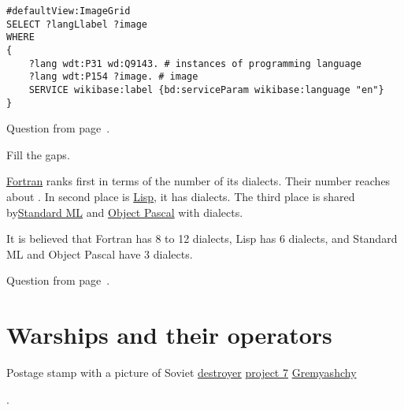\begin{lstlisting}[language=SPARQL, 
    caption={Programmers languages logos. SPARQL query: \href{https://w.wiki/kfd}{https://w.wiki/kfd}}, 
    label=lst:prog_lang_answer_1
                ]
#defaultView:ImageGrid
SELECT ?langLlabel ?image
WHERE
{
	?lang wdt:P31 wd:Q9143. # instances of programming language
	?lang wdt:P154 ?image. # image
	SERVICE wikibase:label {bd:serviceParam wikibase:language "en"}
}
\end{lstlisting}

Question from page~\pageref{question:prog_lang_2}.


\begin{exercise}
    \label{answer:prog_lang_3}
Fill the gaps.

\href{https://www.wikidata.org/wiki/Q83303}{Fortran} ranks first in terms of the number of its dialects. Their number reaches about \underline{\hspace{1cm}}. In second place is \href{https://www.wikidata.org/wiki/Q132874}{Lisp}, it has \underline{\hspace{1cm}} dialects. The third place is shared by\href{https://www.wikidata.org/wiki/Q597330}{Standard ML} and \href{https://www.wikidata.org/wiki/Q633894}{Object Pascal} with \underline{\hspace{1cm}} dialects.
\end{exercise}
 It is believed that Fortran has 8 to 12 dialects, Lisp has 6 dialects, and Standard ML and Object Pascal have 3 dialects.
    
Question from page~\pageref{question:prog_lang_3}.




\section{Warships and their operators}

\begin{marginfigure}[0.0cm]
	{
	  \setlength{\fboxsep}{0pt}%
	  \setlength{\fboxrule}{1pt}%
	}
	\caption{Postage stamp with a picture of Soviet \href{https://en.wikipedia.org/wiki/Destroyer}{destroyer} \href{https://en.wikipedia.org/wiki/Gnevny-class_destroyer}{project 7} \href{https://en.wikipedia.org/wiki/Soviet_destroyer_Gremyashchy_(1937)}{Gremyashchy}}.%
	\label{fig:grem_answer}%
\end{marginfigure}

